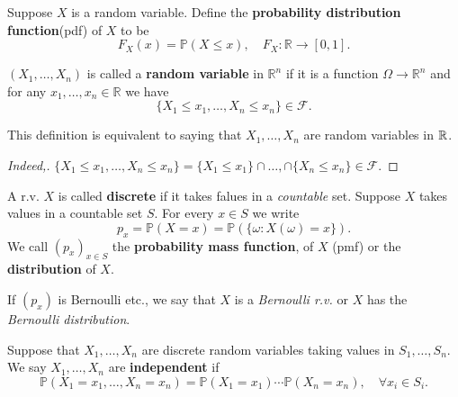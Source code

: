 \begin{definition}
    Suppose $X$ is a random variable. Define the \textbf{probability distribution function}(pdf) of $X$ to be 
    \[
        F_X(x) = \mathbb{P}(X\le x),\quad F_X: \mathbb{R} \to [0,1].
    \]
\end{definition}

\begin{definition}
    $ (X_1,\dots,X_n) $ is called a \textbf{random variable} in $ \mathbb{R}^{n} $ if it is a function $\Omega\to \mathbb{R}^{n}$ and for any $ x_1,\dots,x_n\in \mathbb{R}  $ we have 
    \[
        \{X_1\le x_1,\dots,X_n\le x_n\} \in \mathscr{F}.
    \]
\end{definition}

\begin{claim}
    This definition is equivalent to saying that $ X_1,\dots,X_n $ are random variables in ${\mathbb{R}}$.
\end{claim}
\begin{proof}[Indeed,]
    $ \{X_1\le x_1,\dots,X_n\le x_n\} = \{X_1\le x_1\}\cap\dots,\cap \{X_n\le x_n \} \in \mathscr{F}$.
\end{proof}

\begin{definition}
    A r.v. $X$ is called \textbf{discrete} if it takes falues in a \textit{countable} set.
    Suppose $X$ takes values in a countable set $S$. For every $x\in S$ we write
    \[
        p_x=\mathbb{P}(X=x) = \mathbb{P}(\{\omega:X(\omega)=x\}).
    \]
    We call $ (p_x)_{x\in S} $ the \textbf{probability mass function}, of $X$ (pmf) or the \textbf{distribution} of $X$.
\end{definition}

\begin{note}
    If $(p_x)$ is Bernoulli etc., we say that $X$ is a \textit{Bernoulli r.v.} or $X$ has the \textit{Bernoulli distribution}.
\end{note}

\begin{definition}
    Suppose that $X_1,\dots,X_n$ are discrete random variables taking values in $S_1,\dots,S_n$. We say $X_1,\dots,X_n$ are \textbf{independent} if 
    \[
        \mathbb{P}(X_1=x_1,\dots,X_n=x_n)=\mathbb{P}(X_1=x_1)\cdots \mathbb{P}(X_n=x_n), \quad \forall x_i\in S_i.
    \]
\end{definition}


